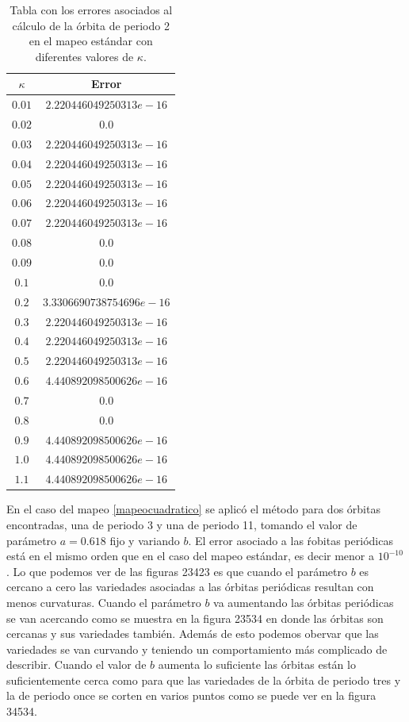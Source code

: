 \begin{center}
\begin{table}[H]
	\centering
	\begin{tabular}{|c|c|}
		\hline
		$\kappa$&  Error  \\
		\hline
		$0.01$ &  $2.220446049250313e-16$\\
		\hline
		$0.02$& $0.0$ \\
		\hline
		$0.03$	& $2.220446049250313e-16$  \\
		\hline
		$0.04$&  $2.220446049250313e-16$\\
		\hline
		$0.05$&  $2.220446049250313e-16$\\
		\hline
		$0.06$&  $2.220446049250313e-16$\\
		\hline
		$0.07$&  $2.220446049250313e-16$\\
		\hline
		$0.08$& $0.0$  \\
		\hline
		$0.09$& $0.0$  \\
		\hline
		$0.1$& $0.0$  \\
		\hline
		$0.2$&$3.3306690738754696e-16$  \\
		\hline
		$0.3$& $2.220446049250313e-16$ \\
		\hline
		$0.4$&$2.220446049250313e-16$  \\
		\hline
		$0.5$&$2.220446049250313e-16$  \\
		\hline
		$0.6$& $4.440892098500626e-16$ \\
		\hline
		$0.7$& $0.0$  \\
		\hline
		$0.8$& $0.0$ \\
		\hline
		$0.9$& $4.440892098500626e-16$   \\
		\hline
		$1.0$& $4.440892098500626e-16$  \\
		\hline
		$1.1$& $4.440892098500626e-16$  \\
		\hline
	\end{tabular}
\caption{Tabla con los errores asociados al c\'alculo de la \'orbita de periodo 2 en el mapeo est\'andar con diferentes valores de $\kappa$.}
\end{table}
\end{center}


En el caso del mapeo \eqref{mapeocuadratico} se aplic\'o el m\'etodo para dos \'orbitas encontradas, una de periodo 3 y una de periodo 11, tomando el valor de par\'ametro $a=0.618$  fijo y variando $b$. El error asociado a las \'robitas peri\'odicas est\'a en el mismo orden que en el caso del mapeo est\'andar, es decir menor a $10^{-10}$. Lo que podemos ver de las figuras 23423 es que cuando el par\'ametro $b$ es cercano a cero las variedades asociadas a las \'orbitas peri\'odicas resultan con menos curvaturas. Cuando el par\'ametro $b$ va aumentando las \'orbitas peri\'odicas se van acercando como se muestra en la figura 23534 en donde las \'orbitas son cercanas y sus variedades tambi\'en. Adem\'as de esto podemos obervar que las variedades se van curvando y teniendo un comportamiento m\'as complicado de describir. Cuando el valor de $b$ aumenta lo suficiente las \'orbitas est\'an lo suficientemente cerca como para que las variedades de la \'orbita de periodo tres y la de periodo once se corten en varios puntos como se puede ver en la figura 34534. \\



